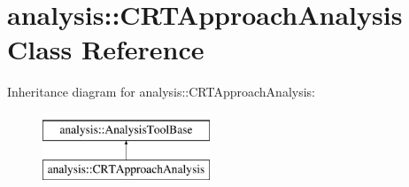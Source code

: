 \hypertarget{classanalysis_1_1CRTApproachAnalysis}{\section{analysis\-:\-:C\-R\-T\-Approach\-Analysis Class Reference}
\label{classanalysis_1_1CRTApproachAnalysis}
}
Inheritance diagram for analysis\-:\-:C\-R\-T\-Approach\-Analysis\-:\begin{figure}[H]
\begin{center}
\leavevmode
\includegraphics[height=2.000000cm]{classanalysis_1_1CRTApproachAnalysis}
\end{center}
\end{figure}
